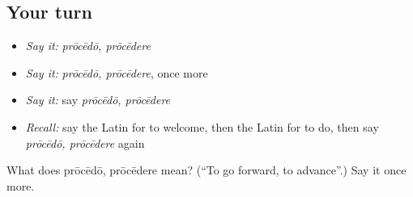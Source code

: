 \subsection*{Your turn}
\begin{itemize}
\raggedright
  \item \emph{Say it:} \emph{prōcēdō, prōcēdere}
  \item \emph{Say it:} \emph{prōcēdō, prōcēdere}, once more
  \item \emph{Say it:} say \emph{prōcēdō, prōcēdere}
  \item \emph{Recall:} say the Latin for to welcome, then the Latin for to do, then say \emph{prōcēdō, prōcēdere} again
\end{itemize}

\begin{tcolorbox}[breakable,colback=teal!4,colframe=teal!35!black,title={Before you move on}]
What does prōcēdō, prōcēdere mean? (\textquotedblleft{}To go forward, to advance\textquotedblright{}.) Say it once more.
\end{tcolorbox}
